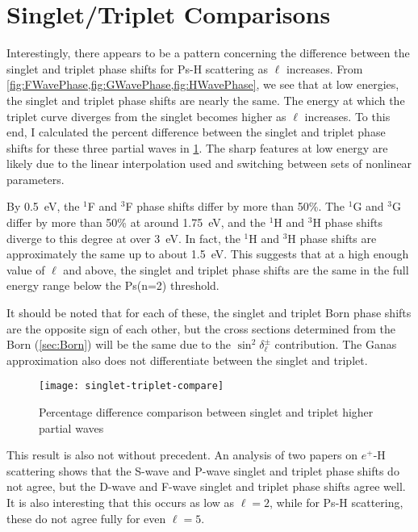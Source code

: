 \documentclass[Dissertation.tex]{subfiles}
\begin{document}
\section{Singlet/Triplet Comparisons}
\label{sec:SingTripCompare}

Interestingly, there appears to be a pattern concerning the difference between
the singlet and triplet phase shifts for Ps-H scattering as $\ell$ increases.
From \cref{fig:FWavePhase,fig:GWavePhase,fig:HWavePhase}, we see that at low
energies, the singlet and triplet phase shifts are nearly the same. The energy
at which the triplet curve diverges from the singlet becomes higher as $\ell$
increases. To this end, I calculated the percent difference between the singlet
and triplet phase shifts for these three partial waves in
\cref{fig:singlet-triplet-compare}. The sharp features at low energy are likely
due to the linear interpolation used and switching between sets of nonlinear 
parameters.

By \SI{0.5}{eV}, the $^1$F and $^3$F phase shifts differ by more than 50\%. The
$^1$G and $^3$G differ by more than 50\% at around \SI{1.75}{eV}, and the $^1$H
and $^3$H phase shifts diverge to this degree at over \SI{3}{eV}. In fact, the
$^1$H and $^3$H phase shifts are approximately the same up to about \SI{1.5}{eV}.
This suggests that at a high enough value of $\ell$ and above, the singlet and
triplet phase shifts are the same in the full energy range below the Ps(n=2)
threshold.

It should be noted that for each of these, the singlet and triplet
Born phase shifts are the opposite sign of each other, but the cross sections
determined from the Born (\cref{sec:Born}) will be the same due to the
$\sin^2 \! \delta_\ell^\pm$ contribution. The Ganas approximation also does
not differentiate between the singlet and triplet.

\begin{figure}[H]
	\centering
	\texttt{[image: singlet-triplet-compare]}
	\caption[Singlet and triplet higher partial wave comparisons]{Percentage difference comparison between singlet and triplet higher partial waves}
	\label{fig:singlet-triplet-compare}
\end{figure}

This result is also not without precedent. An analysis of two papers on
$e^+$-H scattering \cite{Shertzer1994,Chen1997} shows that the S-wave and
P-wave singlet and triplet phase shifts do not agree, but the D-wave and
F-wave singlet and triplet phase shifts agree well. It is also interesting
that this occurs as low as $\ell = 2$, while for Ps-H scattering, these do
not agree fully for even $\ell = 5$.


\biblio
\end{document}
